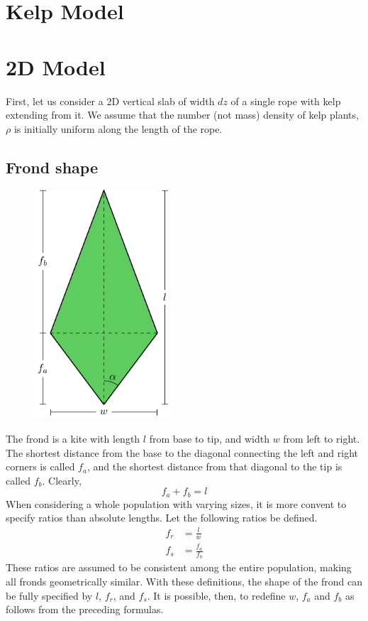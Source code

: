 \section{Kelp Model}

\section{2D Model}
First, let us consider a 2D vertical slab of width $dz$ of a single rope with kelp extending from it.
We assume that the number (not mass) density of kelp plants, $\rho$ is initially uniform along the length of the rope.

\subsection{Frond shape}
\label{sec:shape}

\begin{figure}[H]
	\centering
	\includegraphics[width=2in]{frond}
	\label{fig:frond}
\end{figure}

The frond is a kite with length $l$ from base to tip, and width $w$ from left to right.
 The shortest distance from the base to the diagonal connecting the left and right corners is called $f_a$, and the shortest distance from that diagonal to the tip is called $f_b$.
 Clearly,
 \begin{equation}
	 f_a + f_b = l
 \end{equation}
When considering a whole population with varying sizes, it is more convent to specify ratios than absolute lengths.
Let the following ratios be defined.
\begin{align}
	f_r &= \frac{l}{w} \\
	f_s &= \frac{f_a}{f_b}
\end{align}
These ratios are assumed to be consistent among the entire population, making all fronds geometrically similar.
With these definitions, the shape of the frond can be fully specified by $l$, $f_r$, and $f_s$.
It is possible, then, to redefine $w$, $f_a$ and $f_b$ as follows from the preceding formulas.

